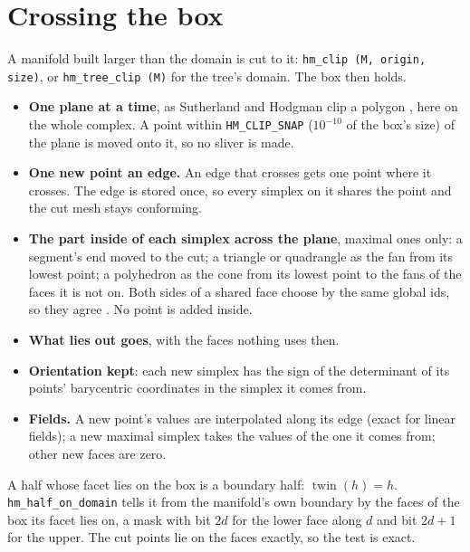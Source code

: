 \documentclass[10pt,a4paper]{article}
\theoremstyle{definition}
\newcommand{\fn}[1]{\texttt{#1}}
\newcommand{\twin}{\operatorname{twin}}
\begin{document}
\section{Crossing the box}
\label{sec:clip}

A manifold built larger than the domain is cut to it: \fn{hm\_clip (M,
origin, size)}, or \fn{hm\_tree\_clip (M)} for the tree's domain. The box
then holds.

\begin{itemize}
  \item \textbf{One plane at a time}, as Sutherland and Hodgman clip a
    polygon \cite{sutherland}, here on the whole complex. A point within
    \fn{HM\_CLIP\_SNAP} ($10^{-10}$ of the box's size) of the plane is moved
    onto it, so no sliver is made.
  \item \textbf{One new point an edge.} An edge that crosses gets one point
    where it crosses. The edge is stored once, so every simplex on it shares
    the point and the cut mesh stays conforming.
  \item \textbf{The part inside of each simplex across the plane}, maximal
    ones only: a segment's end moved to the cut; a triangle or quadrangle
    as the fan from its lowest point; a polyhedron as the cone from its
    lowest point to the fans of the faces it is not on. Both sides of a
    shared face choose by the same global ids, so they agree
    \cite{dompierre}. No point is added inside.
  \item \textbf{What lies out goes}, with the faces nothing uses then.
  \item \textbf{Orientation kept}: each new simplex has the sign of the
    determinant of its points' barycentric coordinates in the simplex it
    comes from.
  \item \textbf{Fields.} A new point's values are interpolated along its
    edge (exact for linear fields); a new maximal simplex takes the values
    of the one it comes from; other new faces are zero.
\end{itemize}

A half whose facet lies on the box is a boundary half: $\twin(h) = h$.
\fn{hm\_half\_on\_domain} tells it from the manifold's own boundary by the
faces of the box its facet lies on, a mask with bit $2d$ for the lower face
along $d$ and bit $2d + 1$ for the upper. The cut points lie on the faces
exactly, so the test is exact.

\end{document}
